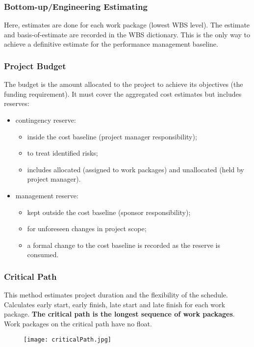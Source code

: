 \documentclass[journal]{IEEEtran}
\begin{document}
\subsubsection{Bottom-up/Engineering Estimating}
Here, estimates are done for each work package (lowest WBS level). The estimate and basis-of-estimate are recorded in the WBS dictionary. This is the only way to achieve a definitive estimate for the performance management baseline.
\subsubsection{Project Budget}
The budget is the amount allocated to the project to achieve its objectives (the funding requirement). It must cover the aggregated cost estimates but includes reserves:
\begin{itemize}
	\item contingency reserve:
	\begin{itemize}
		\item inside the cost baseline (project manager responsibility);
		\item to treat identified risks;
		\item includes allocated (assigned to work packages) and unallocated (held by project manager).
	\end{itemize}
	\item management reserve:
	\begin{itemize}
		\item kept outside the cost baseline (sponsor responsibility);
		\item for unforeseen changes in project scope;
		\item a formal change to the cost baseline is recorded as the reserve is consumed.
	\end{itemize}
\end{itemize}
\subsubsection{Critical Path}
This method estimates project duration and the flexibility of the schedule. Calculates early start, early finish, late start and late finish for each work package. \textbf{The critical path is the longest sequence of work packages}. Work packages on the critical path have no float. 
	\begin{figure}[h]
		\hfill\texttt{[image: criticalPath.jpg]}\hspace*{\fill}
	\end{figure}
\end{document}
